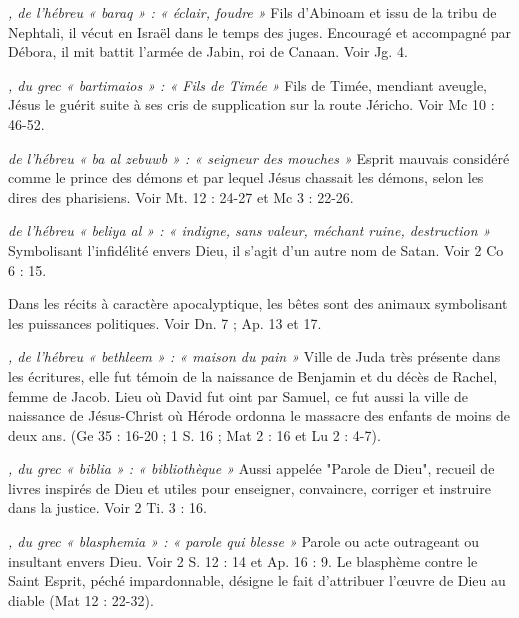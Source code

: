 \begin{multicols}{2}
\textit{, de l'hébreu « baraq » : « éclair, foudre »}\newline
Fils d'Abinoam et issu de la tribu de Nephtali, il vécut en Israël dans le temps des juges. Encouragé et accompagné par Débora, il mit battit l'armée de Jabin, roi de Canaan. Voir Jg. 4.

\textit{, du grec « bartimaios » : « Fils de Timée »}\newline
Fils de Timée, mendiant aveugle, Jésus le guérit suite à ses cris de supplication sur la route Jéricho. Voir Mc 10 : 46-52.

\textit{de l'hébreu « ba al zebuwb » : « seigneur des mouches »}\newline
Esprit mauvais considéré comme le prince des démons et par lequel Jésus chassait les démons, selon les dires des pharisiens. Voir Mt. 12 : 24-27 et Mc 3 : 22-26.

\textit{de l'hébreu « beliya al » : « indigne, sans valeur, méchant ruine, destruction »}\newline
Symbolisant l'infidélité envers Dieu, il s’agit d’un autre nom de Satan. Voir 2 Co 6 : 15.

\textit{}\newline
Dans les récits à caractère apocalyptique, les bêtes sont des animaux symbolisant les puissances politiques. Voir Dn. 7 ; Ap. 13 et 17.

\textit{, de l’hébreu « bethleem » : « maison du pain »}\newline
Ville de Juda très présente dans les écritures, elle fut témoin de la naissance de Benjamin et du décès de Rachel, femme de Jacob. Lieu où David fut oint par Samuel, ce fut aussi la ville de naissance de Jésus-Christ où Hérode ordonna le massacre des enfants de moins de deux ans. (Ge 35 : 16-20 ; 1 S. 16 ; Mat 2 : 16 et Lu 2 : 4-7).

\textit{, du grec « biblia » : « bibliothèque »}\newline
Aussi appelée "Parole de Dieu", recueil de livres inspirés de Dieu et utiles pour enseigner, convaincre, corriger et instruire dans la justice. Voir 2 Ti. 3 : 16.

\textit{, du grec « blasphemia » : « parole qui blesse »}\newline
Parole ou acte outrageant ou insultant envers Dieu. Voir 2 S. 12 : 14 et Ap. 16 : 9.
Le blasphème contre le Saint Esprit, péché impardonnable, désigne le fait d'attribuer l'œuvre de Dieu au diable (Mat 12 : 22-32).


\end{multicols}
